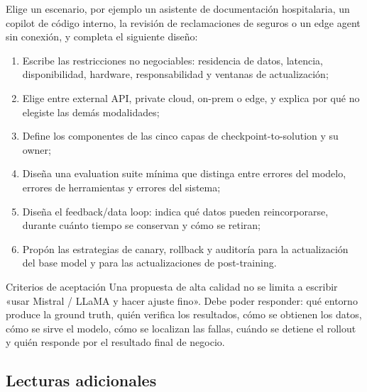 \documentclass[a4paper]{article}
\begin{document}
Elige un escenario, por ejemplo un asistente de documentación hospitalaria, un copilot de código interno, la revisión de reclamaciones de seguros o un edge agent sin conexión, y completa el siguiente diseño:

\begin{enumerate}
  \item Escribe las restricciones no negociables: residencia de datos, latencia, disponibilidad, hardware, responsabilidad y ventanas de actualización;
  \item Elige entre external API, private cloud, on-prem o edge, y explica por qué no elegiste las demás modalidades;
  \item Define los componentes de las cinco capas de checkpoint-to-solution y su owner;
  \item Diseña una evaluation suite mínima que distinga entre errores del modelo, errores de herramientas y errores del sistema;
  \item Diseña el feedback/data loop: indica qué datos pueden reincorporarse, durante cuánto tiempo se conservan y cómo se retiran;
  \item Propón las estrategias de canary, rollback y auditoría para la actualización del base model y para las actualizaciones de post-training.
\end{enumerate}

\begin{knowledgebox}{Criterios de aceptación}
Una propuesta de alta calidad no se limita a escribir «usar Mistral / LLaMA y hacer ajuste fino». Debe poder responder: qué entorno produce la ground truth, quién verifica los resultados, cómo se obtienen los datos, cómo se sirve el modelo, cómo se localizan las fallas, cuándo se detiene el rollout y quién responde por el resultado final de negocio.
\end{knowledgebox}

\subsection{Lecturas adicionales}
\end{document}

